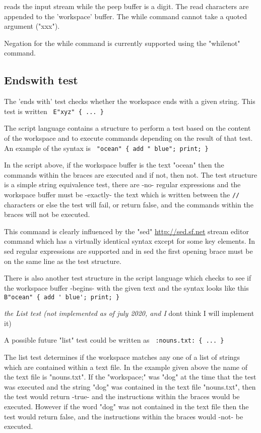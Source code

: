 \documentclass[a4paper,12pt]{article}
\begin{document}
  reads the input stream while the peep buffer is a digit.
  The read characters are appended to the 'workspace' buffer.
  The while command cannot take a quoted argument ("xxx").

  Negation for the while command is currently supported
  using the "whilenot" command.

\subsection{Endswith test}

  The 'ends with' test checks whether the workspace ends
  with a given string. This test is written 
 \verb| E"xyz" { ... } |


 The script language contains a structure to perform a
 test based on the content of the workspace and to
 execute commands depending on the result of that test.
 An example of the syntax is 
 \verb| "ocean" { add " blue"; print; } |


 In the script above, if the workspace buffer is the text "ocean" then the
 commands within the braces are executed and if not, then not. The test
 structure is a simple string equivalence test, there are -no- regular
 expressions and the workspace buffer must be -exactly- the text which is
 written between the \texttt{//} characters or else the test will fail, or return
 false, and the commands within the braces will not be executed.

 This command is clearly influenced by the "sed" \url{http://sed.sf.net}
 stream editor command which has a virtually identical syntax
 except for some key elements. In sed regular expressions are
 supported and in sed the first opening brace must be on the
 same line as the test structure.

 There is also another test structure in the script language
 which checks to see if the workspace buffer -begins- with the
 given text and the syntax looks like this 
 \verb| B"ocean" { add ' blue'; print; } |

 \emph{ the List test (not implemented as of july 2020, and I }
   dont think I will implement it)

 A possible future "list" test could be written as 
 \verb| :nouns.txt: { ... }  |


 The list test determines if the workspace matches any one
 of a list of strings which are contained within a text
 file. In the example given above the name of the text file
 is "nouns.txt". If the "workspace;" was "dog" at the time
 that the test was executed and the string "dog" was
 contained in the text file "nouns.txt", then the test would
 return -true- and the instructions within the braces would
 be executed. However if the word "dog" was not contained
 in the text file then the test would return false, and
 the instructions within the braces would -not- be
 executed.
\end{document}
